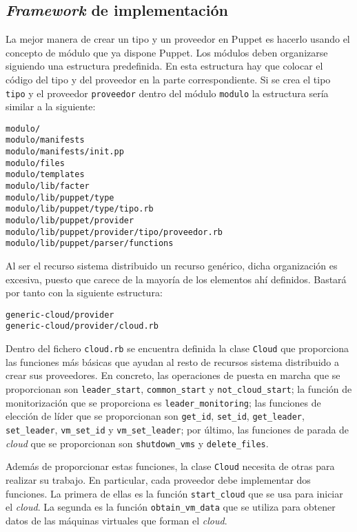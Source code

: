 \subsection{\emph{Framework} de implementación}
\label{sec:modelado-framework}


La mejor manera de crear un tipo y un proveedor en Puppet es hacerlo usando el concepto de módulo que ya dispone Puppet. Los módulos deben organizarse siguiendo una estructura predefinida. En esta estructura hay que colocar el código del tipo y del proveedor en la parte correspondiente. Si se crea el tipo \texttt{tipo} y el proveedor \texttt{proveedor} dentro del módulo \texttt{modulo} la estructura sería similar a la siguiente:

\begin{lstlisting}
modulo/
modulo/manifests
modulo/manifests/init.pp
modulo/files
modulo/templates
modulo/lib/facter
modulo/lib/puppet/type
modulo/lib/puppet/type/tipo.rb
modulo/lib/puppet/provider
modulo/lib/puppet/provider/tipo/proveedor.rb
modulo/lib/puppet/parser/functions
\end{lstlisting}

Al ser el recurso sistema distribuido un recurso genérico, dicha organización es excesiva, puesto que carece de la mayoría de los elementos ahí definidos. Bastará por tanto con la siguiente estructura:

\begin{lstlisting}
generic-cloud/provider
generic-cloud/provider/cloud.rb
\end{lstlisting}

Dentro del fichero \texttt{cloud.rb} se encuentra definida la clase \texttt{Cloud} que proporciona las funciones más básicas que ayudan al resto de recursos sistema distribuido a crear sus proveedores. En concreto, las operaciones de puesta en marcha que se proporcionan son \texttt{leader\_start}, \texttt{common\_start} y \texttt{not\_cloud\_start}; la función de monitorización que se proporciona es \texttt{leader\_monitoring}; las funciones de elección de líder que se proporcionan son \texttt{get\_id}, \texttt{set\_id}, \texttt{get\_leader}, \texttt{set\_leader}, \texttt{vm\_set\_id} y \texttt{vm\_set\_leader}; por último, las funciones de parada de \emph{cloud} que se proporcionan son \texttt{shutdown\_vms} y \texttt{delete\_files}.

Además de proporcionar estas funciones, la clase \texttt{Cloud} necesita de otras para realizar su trabajo. En particular, cada proveedor debe implementar dos funciones. La primera de ellas es la función \texttt{start\_cloud} que se usa para iniciar el \emph{cloud}. La segunda es la función \texttt{obtain\_vm\_data} que se utiliza para obtener datos de las máquinas virtuales que forman el \emph{cloud}.

